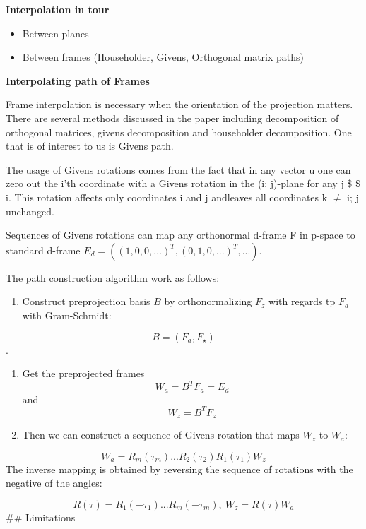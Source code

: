 \textbf{Interpolation in tour}

\begin{itemize}
\tightlist
\item
  Between planes
\item
  Between frames (Householder, Givens, Orthogonal matrix paths)
\end{itemize}

\textbf{Interpolating path of Frames}

Frame interpolation is necessary when the orientation of the projection matters. There are several methods discussed in the paper including decomposition of orthogonal matrices, givens decomposition and householder decomposition. One that is of interest to us is Givens path.

The usage of Givens rotations comes from the fact that in any vector u one can zero out the i'th coordinate with a Givens rotation in the (i; j)-plane for any j \$ \neq \$ i. This rotation affects only coordinates i and j andleaves all coordinates k \(\neq\) i; j unchanged.

Sequences of Givens rotations can map any orthonormal d-frame F in p-space to standard d-frame \(E_d=((1, 0, 0, ...)^T, (0, 1, 0, ...)^T, ...)\).

The path construction algorithm work as follows:

\begin{enumerate}
\def\labelenumi{\arabic{enumi}.}
\tightlist
\item
  Construct preprojection basis \(B\) by orthonormalizing \(F_z\) with regards tp \(F_a\) with Gram-Schmidt:
\end{enumerate}

\[B = (F_a, F_{\star})\].

\begin{enumerate}
\def\labelenumi{\arabic{enumi}.}
\setcounter{enumi}{1}
\tightlist
\item
  Get the preprojected frames
  \[W_a = B^TF_a = E_d\] and \[W_z = B^TF_z\]
\item
  Then we can construct a sequence of Givens rotation that maps \(W_z\) to \(W_a\):
\end{enumerate}

\[ W_a = R_m(\tau_m) ... R_2(\tau_2)R_1(\tau_1)W_z\] The inverse mapping is obtained by reversing the sequence of rotations with the negative of the angles:

\[R(\tau) = R_1(-\tau_1) ... R_m(-\tau_m), \    W_z = R(\tau)W_a\]
\#\# Limitations

